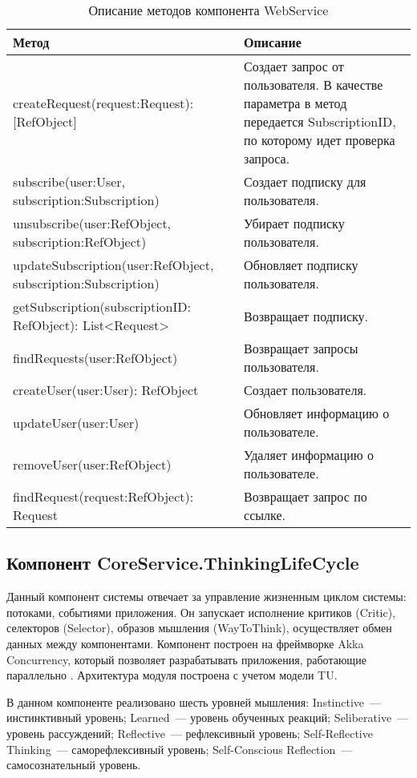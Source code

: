 \begin{table} [htbp]
   \center
   \parbox{15cm}{\caption{Описание методов компонента WebService}\label{WebServiceDescription}}
  \begin{tabular}{| p{8cm} |p{7cm} |}
  
  \hline
\textbf{Метод} & \textbf{Описание} \\
  \hline
  createRequest(request:Request): [RefObject] & Создает запрос от пользователя. В качестве параметра в метод передается SubscriptionID, по которому идет проверка запроса. \\
  
  \hline
  subscribe(user:User, subscription:Subscription)  & Создает подписку для пользователя. \\
  \hline
  unsubscribe(user:RefObject, subscription:RefObject)   & Убирает подписку пользователя. \\
  \hline
  updateSubscription(user:RefObject, subscription:Subscription)   & Обновляет подписку пользователя. \\
  \hline
  getSubscription(subscriptionID: RefObject): List<Request>    & Возвращает подписку. \\
  \hline
  findRequests(user:RefObject)     & Возвращает запросы пользователя. \\
  \hline
  createUser(user:User): RefObject     & Создает пользователя. \\
  \hline
  updateUser(user:User)     & Обновляет информацию о пользователе. \\ 
  \hline
  removeUser(user:RefObject)     & Удаляет информацию о пользователе. \\ 
  \hline
  findRequest(request:RefObject): Request     & Возвращает запрос по ссылке. \\ 
 
  \hline
\end{tabular}

\end{table}
\clearpage
\subsection{Компонент CoreService.ThinkingLifeCycle} \label{ThinkingLifeCycle}
Данный компонент системы отвечает за управление жизненным циклом системы: потоками, событиями приложения. Он запускает исполнение критиков (Critic), селекторов (Selector), образов мышления (WayToThink), осуществляет обмен данных между компонентами. Компонент построен на фреймворке Akka Concurrency, который позволяет разрабатывать приложения, работающие параллельно \cite{AkkaConcurrency}. Архитектура модуля построена с учетом модели TU. \par
В данном компоненте реализовано шесть уровней мышления: Instinctive~--- инстинктивный уровень; Learned~--- уровень обученных реакций; Seliberative~--- уровень рассуждений; Reflective~--- рефлексивный уровень; Self-Reflective Thinking~--- саморефлексивный уровень; Self-Conscious Reflection~--- самосознательный уровень. \par

